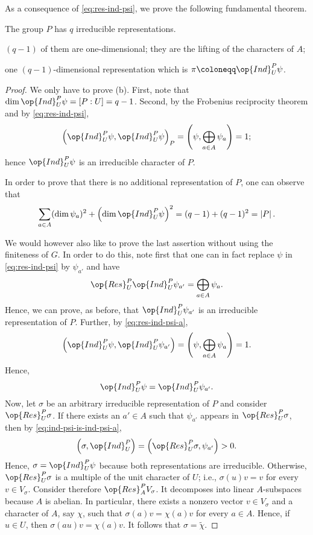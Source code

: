 \documentclass[../main.tex]{subfiles}
\begin{document}
As a consequence of \eqref{eq:res-ind-psi}, we prove the following fundamental theorem.
\begin{theorem} \label{thm:reps-of-p}
	The group $P$ has $q$ irreducible representations.
	\begin{listalph}
		\item $(q-1)$ of them are one-dimensional; they are the lifting of the characters of $A$;
		\item one $(q-1)$-dimensional representation which is $\pi\coloneqq\op{Ind}^P_U\psi$.
	\end{listalph}
\end{theorem}
\begin{proof}
	We only have to prove (b). First, note that $\dim\op{Ind}^P_U\psi=[P:U]=q-1$. Second, by the Frobenius reciprocity theorem and by \eqref{eq:res-ind-psi},
	\[\left(\op{Ind}^P_U\psi,\op{Ind}^P_U\psi\right)_P=\left(\psi,\bigoplus_{a\in A}\psi_a\right)=1;\]
	hence $\op{Ind}^P_U\psi$ is an irreducible character of $P$.

	In order to prove that there is no additional representation of $P$, one can observe that
	\[\sum_{a\in A}(\dim\psi_a)^2+\left(\dim\op{Ind}^P_U\psi\right)^2=(q-1)+(q-1)^2=\left|P\right|.\]

	We would however also like to prove the last assertion without using the finiteness of $G$. In order to do this, note first that one can in fact replace $\psi$ in \eqref{eq:res-ind-psi} by $\psi_{a'}$ and have
	\begin{equation}
		\op{Res}^P_U\op{Ind}^P_U\psi_{a'}=\bigoplus_{a\in A}\psi_{a}. \label{eq:res-ind-psi-a}
	\end{equation}
	Hence, we can prove, as before, that $\op{Ind}^P_U\psi_{a'}$ is an irreducible representation of $P$. Further, by \eqref{eq:res-ind-psi-a},
	\[\left(\op{Ind}^P_U\psi,\op{Ind}^P_U\psi_{a'}\right)=\left(\psi,\bigoplus_{a\in A}\psi_a\right)=1.\]
	Hence,
	\begin{equation}
		\op{Ind}^P_U\psi=\op{Ind}^P_U\psi_{a'}. \label{eq:ind-psi-is-ind-psi-a}
	\end{equation}
	Now, let $\sigma$ be an arbitrary irreducible representation of $P$ and consider $\op{Res}^P_U\sigma$. If there exists an $a'\in A$ such that $\psi_{a'}$ appears in $\op{Res}^P_U\sigma$, then by \eqref{eq:ind-psi-is-ind-psi-a},
	\[\left(\sigma,\op{Ind}^P_U\right)=\left(\op{Res}^P_U\sigma,\psi_{a'}\right)>0.\]
	Hence, $\sigma=\op{Ind}^P_U\psi$ because both representations are irreducible. Otherwise, $\op{Res}^P_U\sigma$ is a multiple of the unit character of $U$; i.e., $\sigma(u)v=v$ for every $v\in V_\sigma$. Consider therefore $\op{Res}^P_AV_\sigma$. It decomposes into linear $A$-subspaces because $A$ is abelian. In particular, there exists a nonzero vector $v\in V_\sigma$ and a character of $A$, say $\chi$, such that $\sigma(a)v=\chi(a)v$ for every $a\in A$. Hence, if $u\in U$, then $\sigma(au)v=\chi(a)v$. It follows that $\sigma=\widetilde\chi$.
\end{proof}
\end{document}
